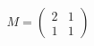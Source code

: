 \documentclass[preview]{standalone}
\begin{document}
\begin{align*}
M = \begin{pmatrix}2 & 1 \\ 1 & 1\end{pmatrix}
\end{align*}
\end{document}
